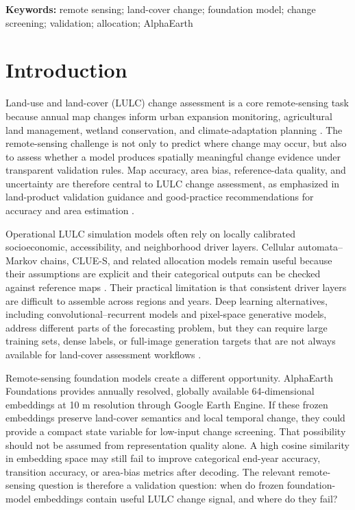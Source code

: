 \documentclass{article}
\newenvironment{keywords}{\par\noindent\textbf{Keywords:} }{\par}%
\begin{document}
\begin{keywords}
remote sensing; land-cover change; foundation model; change screening; validation; allocation; AlphaEarth
\end{keywords}

\section{Introduction}
\label{sec:intro}

Land-use and land-cover (LULC) change assessment is a core remote-sensing task because annual map changes inform urban expansion monitoring, agricultural land management, wetland conservation, and climate-adaptation planning \citep{verburg2004lulc}. The remote-sensing challenge is not only to predict where change may occur, but also to assess whether a model produces spatially meaningful change evidence under transparent validation rules. Map accuracy, area bias, reference-data quality, and uncertainty are therefore central to LULC change assessment, as emphasized in land-product validation guidance and good-practice recommendations for accuracy and area estimation \citep{ceoslpv2026,olofsson2014good,stehman2019key}.

Operational LULC simulation models often rely on locally calibrated socioeconomic, accessibility, and neighborhood driver layers. Cellular automata--Markov chains, CLUE-S, and related allocation models remain useful because their assumptions are explicit and their categorical outputs can be checked against reference maps \citep{veldkamp2004clues,verburg2002clues}. Their practical limitation is that consistent driver layers are difficult to assemble across regions and years. Deep learning alternatives, including convolutional--recurrent models and pixel-space generative models, address different parts of the forecasting problem, but they can require large training sets, dense labels, or full-image generation targets that are not always available for land-cover assessment workflows \citep{shi2015convlstm,smith2023earthpt,khanna2023diffusionsat}.

Remote-sensing foundation models create a different opportunity. AlphaEarth Foundations \citep{brown2025alphaearth} provides annually resolved, globally available 64-dimensional embeddings at 10 m resolution through Google Earth Engine. If these frozen embeddings preserve land-cover semantics and local temporal change, they could provide a compact state variable for low-input change screening. That possibility should not be assumed from representation quality alone. A high cosine similarity in embedding space may still fail to improve categorical end-year accuracy, transition accuracy, or area-bias metrics after decoding. The relevant remote-sensing question is therefore a validation question: when do frozen foundation-model embeddings contain useful LULC change signal, and where do they fail?
\end{document}
